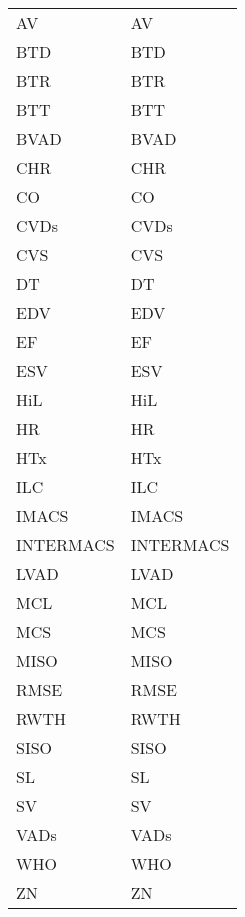 \begin{tabularx}{\textwidth}{p{}X}
\acs{AV} & \acl{AV} \\
\acs{BTD} & \acl{BTD} \\
\acs{BTR} & \acl{BTR} \\
\acs{BTT} & \acl{BTT} \\
\acs{BVAD} & \acl{BVAD} \\
\acs{CHR} & \acl{CHR} \\
\acs{CO} & \acl{CO} \\
\acs{CVDs} & \acl{CVDs} \\
\acs{CVS} & \acl{CVS} \\
\acs{DT} & \acl{DT} \\
\acs{EDV} & \acl{EDV} \\
\acs{EF} & \acl{EF} \\
\acs{ESV} & \acl{ESV} \\
\acs{HiL} & \acl{HiL} \\
\acs{HR} & \acl{HR} \\
\acs{HTx} & \acl{HTx} \\
\acs{ILC} & \acl{ILC} \\
\acs{IMACS} & \acl{IMACS}\\
\acs{INTERMACS} & \acl{INTERMACS}\\
\acs{LVAD} & \acl{LVAD} \\
\acs{MCL} & \acl{MCL} \\
\acs{MCS} & \acl{MCS} \\
\acs{MISO} & \acl{MISO}\\
\acs{RMSE} & \acl{RMSE}\\
\acs{RWTH} & \acl{RWTH}\\
\acs{SISO} & \acl{SISO}\\
\acs{SL} & \acl{SL}\\
\acs{SV} & \acl{SV} \\
\acs{VADs} & \acl{VADs} \\
\acs{WHO} & \acl{WHO} \\
\acs{ZN} & \acl{ZN} \\
\end{tabularx}
%
%
